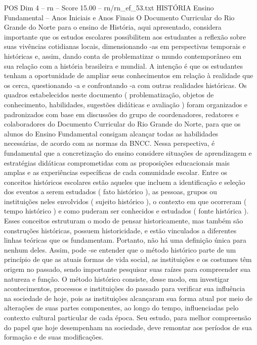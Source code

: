 \begin{textsample}{POS Dim 4 – rn – Score 15.00 – rn/rn\_ef\_53.txt}  \label{ex:f4_pos_082}
HISTÓRIA Ensino Fundamental – Anos Iniciais e Anos Finais O Documento Curricular do Rio Grande do Norte para o ensino de História, aqui apresentado, considera importante que os estudos escolares possibilitem aos estudantes a reflexão sobre suas vivências cotidianas locais, dimensionando -as em perspectivas temporais e históricas e, assim, dando conta de problematizar o mundo contemporâneo em sua relação com a história brasileira e mundial.
A intenção é que os estudantes tenham a oportunidade de ampliar seus conhecimentos em relação à realidade que os cerca, questionando -a e confrontando -a com outras realidades históricas.
Os quadros estabelecidos neste documento ( problematização, objetos de conhecimento, habilidades, sugestões didáticas e avaliação ) foram organizados e padronizados com base em discussões do grupo de coordenadores, redatores e colaboradores do Documento Curricular do Rio Grande do Norte, para que os alunos do Ensino Fundamental consigam alcançar todas as habilidades necessárias, de acordo com as normas da BNCC.
Nessa perspectiva, é fundamental que a concretização do ensino considere situações de aprendizagem e estratégias didáticas comprometidas com as proposições educacionais mais amplas e as experiências específicas de cada comunidade escolar.
Entre os conceitos históricos escolares estão aqueles que incluem a identificação e seleção dos eventos a serem estudados ( fato histórico ), as pessoas, grupos ou instituições neles envolvidos ( sujeito histórico ), o contexto em que ocorreram ( tempo histórico ) e como puderam ser conhecidos e estudados ( fonte histórica ).
Esses conceitos estruturam o modo de pensar historicamente, mas também são construções históricas, possuem historicidade, e estão vinculados a diferentes linhas teóricas que os fundamentam.
Portanto, não há uma definição única para nenhum deles.
Assim, pode -se entender que o método histórico parte de um princípio de que as atuais formas de vida social, as instituições e os costumes têm origem no passado, sendo importante pesquisar suas raízes para compreender sua natureza e função.
O método histórico consiste, desse modo, em investigar acontecimentos, processos e instituições do passado para verificar sua influência na sociedade de hoje, pois as instituições alcançaram sua forma atual por meio de alterações de suas partes componentes, ao longo do tempo, influenciadas pelo contexto cultural particular de cada época.
Seu estudo, para melhor compreensão do papel que hoje desempenham na sociedade, deve remontar aos períodos de sua formação e de suas modificações.

\end{textsample}
